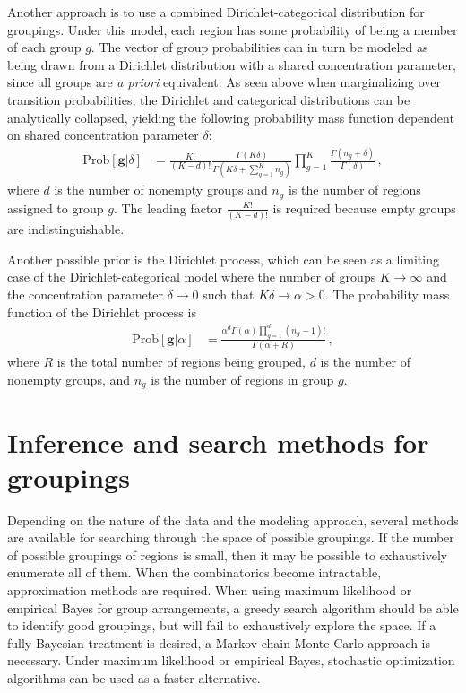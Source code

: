 \documentclass[12pt]{article}
\newcommand{\bg}{\mathbf{g}}
\newcommand{\Prob}{\mathrm{Prob}}
\begin{document}
Another approach is to use a combined Dirichlet-categorical distribution for groupings. Under this model, each region has some probability of being a member of each group $g$. The vector of group probabilities can in turn be modeled as being drawn from a Dirichlet distribution with a shared concentration parameter, since all groups are \emph{a priori} equivalent. As seen above when marginalizing over transition probabilities, the Dirichlet and categorical distributions can be analytically collapsed, yielding the following probability mass function dependent on shared concentration parameter $\delta$:
\begin{align}
	\Prob \left[ \bg | \delta \right] &=
	\frac{K!}{(K-d)!}
	\frac{
		\Gamma \left( K\delta \right)
	}{
		\Gamma \left( K\delta + \sum_{g=1}^{K} n_g \right)
	}
	\prod_{g=1}^{K}
	\frac{
		\Gamma \left( n_g + \delta \right)
	}{
		\Gamma \left( \delta \right)
	} \, ,
\end{align}
where $d$ is the number of nonempty groups and $n_g$ is the number of regions assigned to group $g$. The leading factor $\frac{K!}{(K-d)!}$ is required because empty groups are indistinguishable.

Another possible prior is the Dirichlet process, which can be seen as a limiting case of the Dirichlet-categorical model \cite{green2001} where the number of groups $K \rightarrow \infty$ and the concentration parameter $\delta \rightarrow 0$ such that $K \delta \rightarrow \alpha > 0$. The probability mass function of the Dirichlet process is
\begin{align}
	\Prob \left[ \bg | \alpha \right]
	&=
	\frac{
		\alpha^d \Gamma(\alpha) \prod_{g=1}^{d} (n_g - 1)!
	}{
		\Gamma(\alpha + R)
	} \, ,
\end{align}
where $R$ is the total number of regions being grouped, $d$ is the number of nonempty groups, and $n_g$ is the number of regions in group $g$.

\section{Inference and search methods for groupings}
\label{inference}

Depending on the nature of the data and the modeling approach, several methods are available for searching through the space of possible groupings. If the number of possible groupings of regions is small, then it may be possible to exhaustively enumerate all of them. When the combinatorics become intractable, approximation methods are required. When using maximum likelihood or empirical Bayes for group arrangements, a greedy search algorithm should be able to identify good groupings, but will fail to exhaustively explore the space. If a fully Bayesian treatment is desired, a Markov-chain Monte Carlo approach is necessary. Under maximum likelihood or empirical Bayes, stochastic optimization algorithms can be used as a faster alternative.
\end{document}
